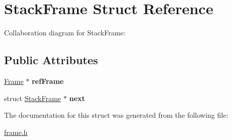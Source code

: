 \hypertarget{structStackFrame}{}\section{Stack\+Frame Struct Reference}
\label{structStackFrame}


Collaboration diagram for Stack\+Frame\+:
\subsection*{Public Attributes}
\begin{DoxyCompactItemize}
\item 
\mbox{\label{structStackFrame_aee414b80c97dcb5e37632a64bbcbff1c}} 
\hyperlink{structFrame}{Frame} $\ast$ {\bfseries ref\+Frame}
\item 
\mbox{\label{structStackFrame_a3cb6ca230d221991df6c9f554aa7a43b}} 
struct \hyperlink{structStackFrame}{Stack\+Frame} $\ast$ {\bfseries next}
\end{DoxyCompactItemize}


The documentation for this struct was generated from the following file\+:\begin{DoxyCompactItemize}
\item 
\hyperlink{frame_8h}{frame.\+h}\end{DoxyCompactItemize}
